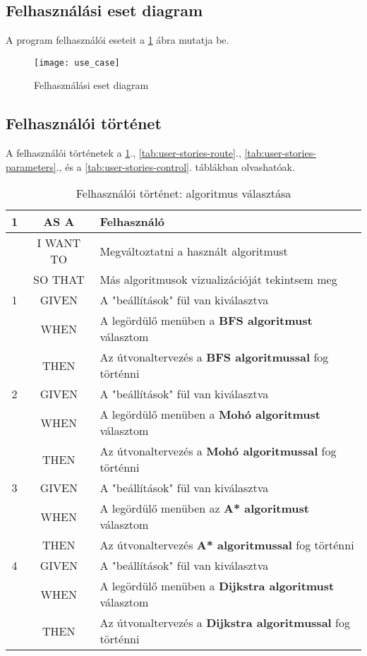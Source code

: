 \subsection{Felhasználási eset diagram}

A program felhasználói eseteit a \ref{fig:use-case} ábra mutatja be.

\begin{figure}[H]
    \centering
    \texttt{[image: use\_case]}
    \caption{Felhasználási eset diagram}
    \label{fig:use-case}
\end{figure}

\subsection{Felhasználói történet}

A felhasználói történetek a \ref{tab:user-stories-algorithm}., \ref{tab:user-stories-route}., \ref{tab:user-stories-parameters}., és a \ref{tab:user-stories-control}. táblákban olvashatóak.

\begin{table}[H]
    \centering
    \begin{tabular}{|c|c|p{10cm}|}
        \hline
        \textbf{1}  
        & AS A          & Felhasználó \\ \hline
        & I WANT TO     & Megváltoztatni a használt algoritmust \\ \hline
        & SO THAT       & Más algoritmusok vizualizációját tekintsem meg \\ \hline
        \hline
        1 & GIVEN   & A "beállítások" fül van kiválasztva \\ \hline
        & WHEN    & A legördülő menüben a \textbf{BFS algoritmust} választom \\ \hline
        & THEN    & Az útvonaltervezés a \textbf{BFS algoritmussal} fog történni \\ \hline
        \hline
        2 & GIVEN   & A "beállítások" fül van kiválasztva \\ \hline
        & WHEN    & A legördülő menüben a \textbf{Mohó algoritmust} választom \\ \hline
        & THEN    & Az útvonaltervezés a \textbf{Mohó algoritmussal} fog történni \\ \hline
        \hline
        3 & GIVEN   & A "beállítások" fül van kiválasztva \\ \hline
        & WHEN    & A legördülő menüben az \textbf{A* algoritmust} választom \\ \hline
        & THEN    & Az útvonaltervezés \textbf{A* algoritmussal} fog történni \\ \hline
        \hline
        4 & GIVEN   & A "beállítások" fül van kiválasztva \\ \hline
        & WHEN    & A legördülő menüben a \textbf{Dijkstra algoritmust} választom \\ \hline
        & THEN    & Az útvonaltervezés a \textbf{Dijkstra algoritmussal} fog történni \\ \hline
    \end{tabular}
    \caption{Felhasználói történet: algoritmus választása}
    \label{tab:user-stories-algorithm}
\end{table}

